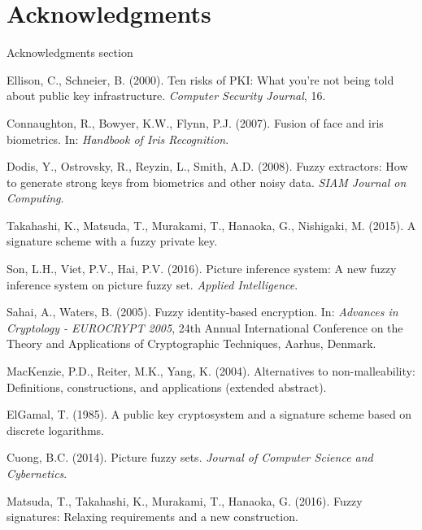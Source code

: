 \documentclass[graybox]{svmult}
\begin{document}
\section*{Acknowledgments}
Acknowledgments section


\begin{thebibliography}{99}
     Ellison, C., Schneier, B. (2000). Ten risks of PKI: What you're not being told about public key infrastructure. \textit{Computer Security Journal}, 16.

     Connaughton, R., Bowyer, K.W., Flynn, P.J. (2007). Fusion of face and iris biometrics. In: \textit{Handbook of Iris Recognition}.

     Dodis, Y., Ostrovsky, R., Reyzin, L., Smith, A.D. (2008). Fuzzy extractors: How to generate strong keys from biometrics and other noisy data. \textit{SIAM Journal on Computing}.

     Takahashi, K., Matsuda, T., Murakami, T., Hanaoka, G., Nishigaki, M. (2015). A signature scheme with a fuzzy private key.

     Son, L.H., Viet, P.V., Hai, P.V. (2016). Picture inference system: A new fuzzy inference system on picture fuzzy set. \textit{Applied Intelligence}.

     Sahai, A., Waters, B. (2005). Fuzzy identity-based encryption. In: \textit{Advances in Cryptology - EUROCRYPT 2005}, 24th Annual International Conference on the Theory and Applications of Cryptographic Techniques, Aarhus, Denmark.

     MacKenzie, P.D., Reiter, M.K., Yang, K. (2004). Alternatives to non-malleability: Definitions, constructions, and applications (extended abstract).

     ElGamal, T. (1985). A public key cryptosystem and a signature scheme based on discrete logarithms.

     Cuong, B.C. (2014). Picture fuzzy sets. \textit{Journal of Computer Science and Cybernetics}.

     Matsuda, T., Takahashi, K., Murakami, T., Hanaoka, G. (2016). Fuzzy signatures: Relaxing requirements and a new construction.
\end{thebibliography}
\end{document}
